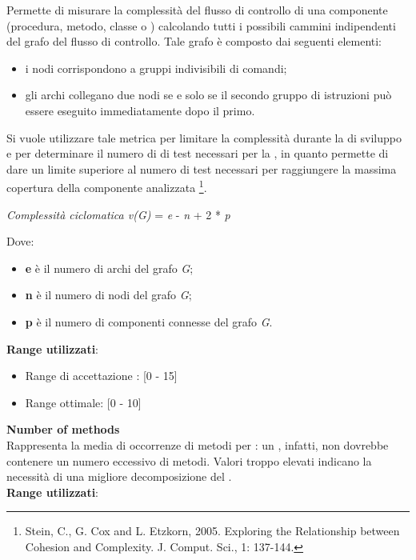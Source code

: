 Permette di misurare la complessità del flusso di controllo di una componente (procedura, metodo, classe o ) calcolando tutti i possibili cammini indipendenti del grafo del flusso di controllo. Tale grafo è composto dai seguenti elementi:
\begin{itemize}
	\item i nodi corrispondono a gruppi indivisibili di comandi;
	\item gli archi collegano due nodi se e solo se il secondo gruppo di istruzioni può essere eseguito immediatamente dopo il primo.
\end{itemize}
Si vuole utilizzare tale metrica per limitare la complessità durante la  di sviluppo e per determinare il numero di  di test necessari per la , in quanto permette di dare un limite superiore al numero di test necessari per raggiungere la massima copertura della componente analizzata \footnote{Stein, C., G. Cox and L. Etzkorn, 2005. Exploring the Relationship between Cohesion and Complexity. J. Comput. Sci., 1: 137-144.}.
\begin{center}
	\textit{Complessità ciclomatica v(G)} = \textit{e} - \textit{n} + 2 * \textit{p}
\end{center}
Dove:
\begin{itemize}
	\item \textbf{e} è il numero di archi del grafo \textit{G};
	\item \textbf{n} è il numero di nodi del grafo \textit{G};
	\item \textbf{p} è il numero di componenti connesse del grafo \textit{G}.
\end{itemize}
\textbf{Range utilizzati}:
\begin{itemize}
	\item Range di accettazione : [0 - 15]
	\item Range ottimale: [0 - 10]
\end{itemize}

\textbf{Number of methods}\\

Rappresenta la media di occorrenze di metodi per : un , infatti, non dovrebbe contenere un numero eccessivo di metodi. Valori troppo elevati indicano la necessità di una migliore decomposizione del . \\

\textbf{Range utilizzati}:

